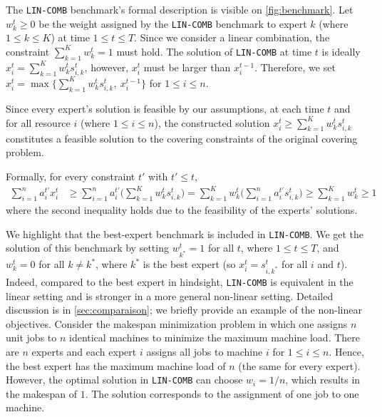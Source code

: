 The \texttt{LIN-COMB} benchmark's formal description is visible on \cref{fig:benchmark}.
Let $w_{k}^{t} \geq 0$ be the weight assigned by the \texttt{LIN-COMB} benchmark to expert $k$ (where $1 \leq k \leq K$) at time
$1 \leq t \leq T$.
Since we consider a linear combination, the constraint $ \sum_{k=1}^{K} w_{k}^{t} = 1$ must hold.
The solution of \texttt{LIN-COMB} at time $t$ is ideally $x_{i}^{t} = \sum_{k=1}^{K} w_{k}^{t} s_{i,k}^{t}$,
however, $x_{i}^{t}$ must be larger than $x_{i}^{t-1}$.
Therefore, we set $x_{i}^{t} = \max\bigl\{\sum_{k=1}^{K} w_{k}^{t} s_{i,k}^{t},\ x_{i}^{t-1}\bigr\}$ for $1 \leq i \leq n$.
%


Since every expert's solution is feasible by our assumptions, at each time $t$ and for all resource $i$ (where $1 \leq i \leq n$),
the constructed solution $x_{i}^{t} \geq \sum_{k=1}^{K} w_{k}^{t} s_{i,k}^{t}$ constitutes a feasible solution to the covering constraints of the original covering problem.

\noindent Formally, for every constraint $t'$ with $t' \leq t$,
%
\begin{align*}
	\sum_{i=1}^{n} a_{i}^{t'} x_{i}^{t} &\geq
	\sum_{i=1}^{n} a_{i}^{t'} \biggl( \sum_{k=1}^{K} w_{k}^{t} s_{i,k}^{t} \biggr)
	= \sum_{k=1}^{K} w_{k}^{t}  \biggl( \sum_{i=1}^{n} a_{i}^{t'} s_{i,k}^{t} \biggr)
	 \geq \sum_{k=1}^{K} w_{k}^{t} \geq 1
\end{align*}
%
where the second inequality holds due to the feasibility of the experts' solutions.
%

We highlight that the best-expert benchmark is included in \texttt{LIN-COMB}. 
We get the solution of this benchmark by setting $w^{t}_{k^{*}} = 1$ for all $t$, where $1 \leq t \leq T$, and $w^{t}_{k} = 0$ for all $k \neq k^{*}$,
where $k^{*}$ is the best expert (so $x_{i}^{t} = s_{i,k^{*}}^{t}$ for all $i$ and $t$).
Indeed, compared to the best expert in hindsight, \texttt{LIN-COMB} is equivalent in the linear setting and 
is stronger in a more general non-linear setting. Detailed discussion is in \cref{sec:comparaison}; we briefly provide an example of the non-linear objectives.  
Consider the makespan minimization problem in which one assigns $n$ unit jobs to $n$ identical machines to minimize the maximum machine load.   
There are $n$ experts and each expert $i$ assigns all jobs to machine $i$ for $1 \leq i \leq n$. Hence, the best expert has the maximum machine load of $n$ (the same for every expert). However, the optimal solution in \texttt{LIN-COMB} can choose $w_{i} = 1/n$, which results in the makespan of $1$. The solution corresponds to the assignment of one job to one machine.  

